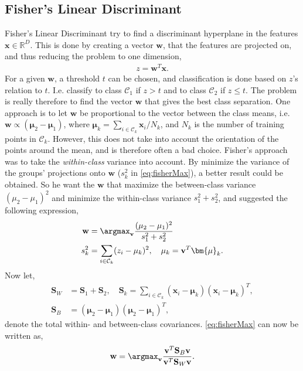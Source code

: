 \subsection{Fisher's Linear Discriminant}
\label{sub:Fisher's Linear Discriminant}
Fisher's Linear Discriminant try to find a discriminant hyperplane in the features $\mathbf{x}\in \mathbb{R}^D$. This is done by creating a vector $\mathbf{w}$, that the features are projected on, and thus reducing the problem to one dimension,
\begin{align}
  z = \mathbf{w}^T\mathbf{x}.
\end{align}
For a given $\mathbf{w}$,  a threshold $t$ can be chosen, and classification is done based on $z$'s relation to $t$.  I.e. classify to class $\mathcal{C}_1$ if $z > t$ and to class $\mathcal{C}_2$ if $z \leq t $. The problem is really therefore to find the vector $\mathbf{w}$ that gives the best class separation. One approach is to let $\mathbf{w}$ be proportional to the vector between the class means, i.e. $\mathbf{w} \propto (\bm{\mu}_2 - \bm{\mu}_1)$, where $\bm{\mu}_k = \sum_{i \in \mathcal{C}_k} \mathbf{x}_i/N_k$, and $N_k$ is the number of training points in $\mathcal{C}_k$. 
However, this does not take into account the orientation of the points around the mean, and is therefore often a bad choice. 
Fisher's approach was to take the \textit{within-class} variance into account. By minimize the variance of the groups' projections onto $\mathbf{w}$ ($s_k^2$ in \eqref{eq:fisherMax}), a better result could be obtained. So he want the $\mathbf{w}$ that maximize the between-class variance $(\mu_2 - \mu_1)^2$ and minimize the within-class variance $s_1^2 + s_2^2$, and suggested the following expression,
\begin{align}
  \label{eq:fisherMax} 
  \mathbf{w} &= \argmax_{\mathbf{v}} \frac{(\mu_2 - \mu_1)^2}{s_1^2 + s_2^2} \\
  s_k^2 &= \sum_{i \in \mathcal{C}_k} (z_i - \mu_k)^2, \quad \mu_k = \mathbf{v}^T\bm{\mu}_k.
\end{align}
Now let,
\begin{align}
  \mathbf{S}_W &= \mathbf{S}_1 + \mathbf{S}_2, \quad  \mathbf{S}_k =  \sum_{i \in \mathcal{C}_k} (\mathbf{x}_i - \bm{\mu}_k)(\mathbf{x}_i - \bm{\mu}_k)^T, \\
  \label{eq:SB} 
  \mathbf{S}_B &= (\bm{\mu}_2 - \bm{\mu}_1)(\bm{\mu}_2 - \bm{\mu}_1)^T,
\end{align}
denote the total within- and between-class covariances. \eqref{eq:fisherMax} can now be written as,
\begin{align}
  \mathbf{w} = \argmax_{\mathbf{v}}  \frac{\mathbf{v}^T\mathbf{S}_B \mathbf{v}}{\mathbf{v}^T \mathbf{S}_W \mathbf{v}}.
\end{align}
